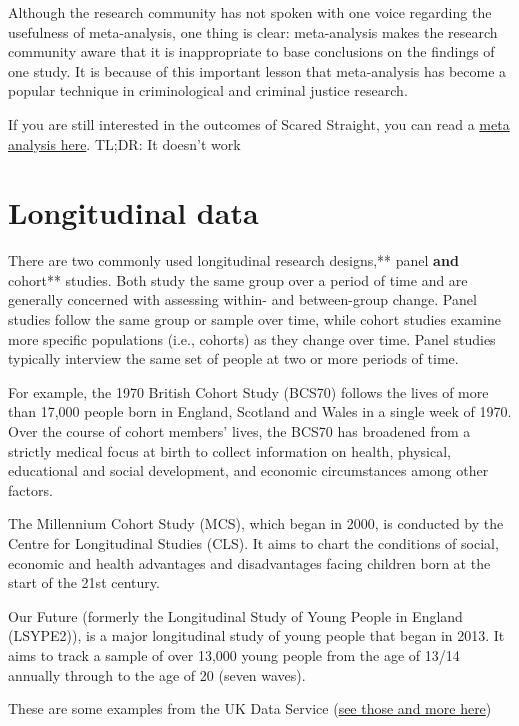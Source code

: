 \documentclass[]{book}
\theoremstyle{definition}
\theoremstyle{definition}
\theoremstyle{definition}
\theoremstyle{remark}
\begin{document}
Although the research community has not spoken with one voice regarding
the usefulness of meta-analysis, one thing is clear: meta-analysis makes
the research community aware that it is inappropriate to base
conclusions on the findings of one study. It is because of this
important lesson that meta-analysis has become a popular technique in
criminological and criminal justice research.

If you are still interested in the outcomes of Scared Straight, you can
read a
\href{http://onlinelibrary.wiley.com/doi/10.1002/14651858.CD002796.pub2/full}{meta
analysis here}. TL;DR: It doesn't work

\hypertarget{longitudinal-data}{%
\section{Longitudinal data}\label{longitudinal-data}}

There are two commonly used longitudinal research designs,** panel
\textbf{and }cohort** studies. Both study the same group over a period
of time and are generally concerned with assessing within- and
between-group change. Panel studies follow the same group or sample over
time, while cohort studies examine more specific populations (i.e.,
cohorts) as they change over time. Panel studies typically interview the
same set of people at two or more periods of time.

For example, the 1970 British Cohort Study (BCS70) follows the lives of
more than 17,000 people born in England, Scotland and Wales in a single
week of 1970. Over the course of cohort members' lives, the BCS70 has
broadened from a strictly medical focus at birth to collect information
on health, physical, educational and social development, and economic
circumstances among other factors.

The Millennium Cohort Study (MCS), which began in 2000, is conducted by
the Centre for Longitudinal Studies (CLS). It aims to chart the
conditions of social, economic and health advantages and disadvantages
facing children born at the start of the 21st century.

Our Future (formerly the Longitudinal Study of Young People in England
(LSYPE2)), is a major longitudinal study of young people that began in
2013. It aims to track a sample of over 13,000 young people from the age
of 13/14 annually through to the age of 20 (seven waves).

These are some examples from the UK Data Service
(\href{https://www.ukdataservice.ac.uk/get-data/key-data/cohort-and-longitudinal-studies}{see
those and more here})
\end{document}
